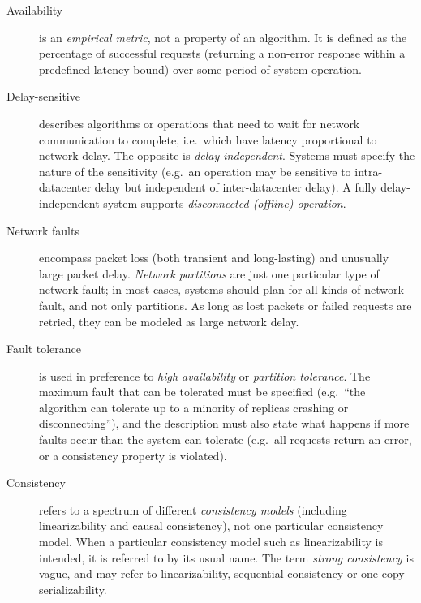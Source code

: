 \documentclass[fleqn,12pt,lineno]{wlpeerj} %
\begin{document}
\begin{description}
\item[Availability] is an \emph{empirical metric}, not a property of an algorithm. It is defined as
    the percentage of successful requests (returning a non-error response within a predefined
    latency bound) over some period of system operation.
\item[Delay-sensitive] describes algorithms or operations that need to wait for network
    communication to complete, i.e.\ which have latency proportional to network delay. The opposite
    is \emph{delay-independent}. Systems must specify the nature of the sensitivity (e.g.\ an
    operation may be sensitive to intra-datacenter delay but independent of inter-datacenter delay).
    A fully delay-independent system supports \emph{disconnected (offline) operation}.
\item[Network faults] encompass packet loss (both transient and long-lasting) and unusually large
    packet delay. \emph{Network partitions} are just one particular type of network fault; in most
    cases, systems should plan for all kinds of network fault, and not only partitions. As long as
    lost packets or failed requests are retried, they can be modeled as large network delay.
\item[Fault tolerance] is used in preference to \emph{high availability} or \emph{partition
    tolerance}. The maximum fault that can be tolerated must be specified (e.g.\ ``the algorithm can
    tolerate up to a minority of replicas crashing or disconnecting''), and the description must
    also state what happens if more faults occur than the system can tolerate (e.g.\ all requests
    return an error, or a consistency property is violated).
\item[Consistency] refers to a spectrum of different \emph{consistency models} (including
    linearizability and causal consistency), not one particular consistency model. When a particular
    consistency model such as linearizability is intended, it is referred to by its usual name. The
    term \emph{strong consistency} is vague, and may refer to linearizability, sequential
    consistency or one-copy serializability.
\end{description}

\end{document}
